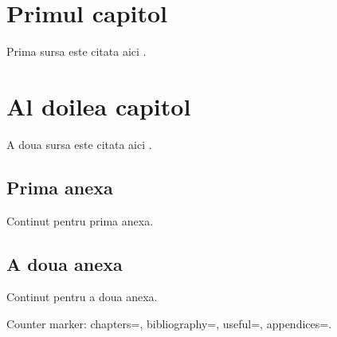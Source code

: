 \documentclass[a4paper,12pt]{report}
\begin{document}
\chapter{Primul capitol}
Prima sursa este citata aici \cite{counter_source_one}.
\chapter{Al doilea capitol}
A doua sursa este citata aici \cite{counter_source_two}.
\bibliographyChapter
\appendixChapter
\section{Prima anexa}
Continut pentru prima anexa.
\section{A doua anexa}
Continut pentru a doua anexa.

Counter marker: chapters=\chapterCount{},
bibliography=\bibliographyEntryCount{},
useful=\usefulPageCount{},
appendices=\anexeCount{}.
\end{document}
